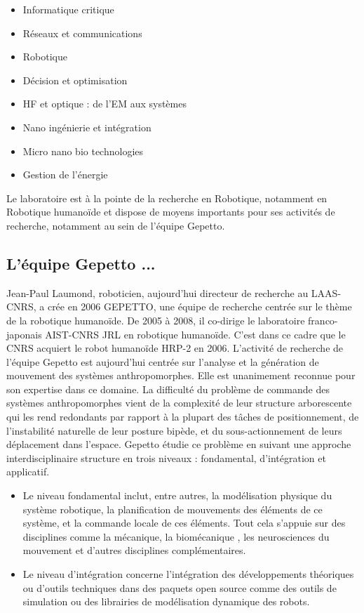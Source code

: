 \documentclass{report}
\begin{document}
\setlength{\columnsep}{10pt}
\begin{multicols}{2}\raggedcolumns
\begin{itemize}
\item Informatique critique
\item Réseaux et communications
\item Robotique
\item Décision et optimisation
\item HF et optique : de l'EM aux systèmes
\item Nano ingénierie et intégration
\item Micro nano bio technologies
\item Gestion de l'énergie
\end{itemize}
\end{multicols}

\noindent
Le laboratoire est à la pointe de la recherche en Robotique, notamment en Robotique humanoïde et dispose de moyens importants pour ses activités de recherche, notamment au sein de l'équipe Gepetto. 

\subsection*{L'équipe Gepetto ...}
Jean-Paul Laumond, roboticien, aujourd'hui directeur de recherche au LAAS-CNRS, a crée en 2006 GEPETTO, une équipe de recherche centrée sur le thème de la robotique humanoïde. De 2005 à 2008, il co-dirige le laboratoire franco-japonais AIST-CNRS JRL en robotique humanoïde. C’est dans ce cadre que le CNRS acquiert le robot humanoïde HRP-2 en 2006. L’activité de recherche de l’équipe Gepetto est aujourd'hui centrée sur l’analyse et la génération de mouvement des systèmes anthropomorphes. Elle est unanimement reconnue pour son expertise dans ce domaine. La difficulté du problème de commande des systèmes anthropomorphes vient de la complexité de leur structure arborescente qui les rend redondants par rapport à la plupart des tâches de positionnement, de l’instabilité naturelle de leur posture bipède, et du sous-actionnement de leurs déplacement dans l’espace. Gepetto étudie ce problème en suivant une approche interdisciplinaire structure en trois niveaux :  fondamental,  d'intégration et applicatif.
\begin{itemize}
\item Le niveau fondamental inclut, entre autres, la modélisation physique du système robotique, la planification de mouvements des éléments de ce système, et la commande locale de ces éléments. Tout cela s'appuie sur des disciplines comme la mécanique, la biomécanique , les neurosciences du mouvement et d'autres disciplines complémentaires.
\item Le niveau d'intégration concerne l'intégration des développements théoriques ou d'outils techniques dans des paquets open source comme des outils de simulation ou des librairies de modélisation dynamique des robots.
\end{itemize}
\end{document}
